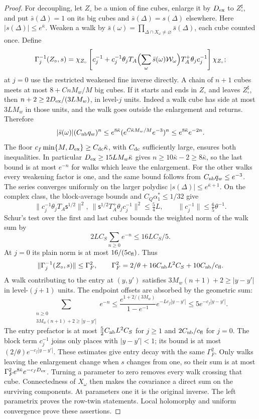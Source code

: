 \documentclass[11pt,letterpaper,reqno]{amsart}
\theoremstyle{definition}
\theoremstyle{remark}
\begin{document}
\begin{proof}
For decoupling, let $Z_\circ$ be a union of fine cubes, enlarge it
by $D_{\rm ex}$ to $Z_\circ^\sharp$, and put $\bar s(\Delta)=1$
on its big cubes and $\bar s(\Delta)=s(\Delta)$ elsewhere.
Here $|s(\Delta)|\le e^{\bar\kappa}$.  Weaken a walk by
$\bar s(\omega)=\prod_{\Delta\cap X_\omega\ne\varnothing}
\bar s(\Delta)$, each cube counted once.  Define
\[
 \Gamma_j^{-1}(Z_\circ,s)=\chi_{Z_\circ}
 \left[c_j^{-1}+c_j^{-1}\theta_jT_A
       \Bigl(\sum_\omega\bar s(\omega)\mathcal W_\omega\Bigr)
                        T_A^+\theta_jc_j^{-1}\right]\chi_{Z_\circ};
\]
at $j=0$ use the restricted weakened fine inverse directly.
A chain of $n+1$ cubes meets at most $8+CnM_w/M$ big cubes.
If it starts and ends in $Z_\circ$ and leaves $Z_\circ^\sharp$,
then $n+2\ge2D_{\rm ex}/(3LM_w)$, in level-$j$ units.
Indeed a walk cube has side at most $3LM_w$ in those units,
and the walk goes outside the enlargement and returns.
Therefore
\[
 |\bar s(\omega)|(C_{\rm nb}q_w)^n
 \le e^{8\bar\kappa}
        (e^{C\bar\kappa M_w/M}e^{-3})^n
 \le e^{8\bar\kappa}e^{-2n}.
\]
The floor $c_f\min\{M,D_{\rm ex}\}\ge
C_{\rm dc}\bar\kappa$, with $C_{\rm dc}$ sufficiently large,
ensures both inequalities. In particular
$D_{\rm ex}\ge15LM_w\bar\kappa$ gives
$n\ge10\bar\kappa-2\ge8\bar\kappa$, so the last bound is
at most $e^{-n}$ for walks which leave the enlargement.
For the other walks every weakening factor is one, and the
same bound follows from $C_{\rm nb}q_w\le e^{-3}$.
The series converges
uniformly on the larger polydisc $|s(\Delta)|\le
e^{\bar\kappa+1}$. On the complex class, the block-average
bounds and $C_Q\alpha_1^*\le1/32$ give
\[
 \|c_j^{-1}\theta_jT_A\mathsf s^{1/2}\|^2,
 \ \|\mathsf s^{1/2}T_A^+\theta_jc_j^{-1}\|^2\le\tfrac54L,
 \qquad \|c_j^{-1}\|\le\tfrac65\theta^{-1}.
\]
Schur's test over the first and last cubes bounds the weighted
norm of the walk sum by
\[
 2LC_S\sum_{n\ge0}e^{-n}\le16LC_S/5.
\]
At $j=0$ its plain norm is at most $16/(5c_{\rm fl})$. Thus
\[
 \|\Gamma_j^{-1}(Z_\circ,s)\|\le\Gamma_F^2,
 \qquad \Gamma_F^2=2/\theta+16C_{\rm nb}L^2C_S
                                      +10C_{\rm nb}/c_{\rm fl}.
\]
A walk contributing to the entry at $(y,y')$ satisfies
$3M_w(n+1)+2\ge|y-y'|$ in level-$(j+1)$ units.
The endpoint offsets are absorbed by the geometric sum:
\[
 \sum_{\substack{n\ge0\\3M_w(n+1)+2\ge|y-y'|}}e^{-n}
 \le\frac{e^{1+2/(3M_w)}}{1-e^{-1}}e^{-Lc_f|y-y'|}
 \le5e^{-c_f|y-y'|}.
\]
The entry prefactor is at most $\tfrac52C_{\rm nb}L^2C_S$
for $j\ge1$ and $2C_{\rm nb}/c_{\rm fl}$ for $j=0$.
The block term $c_j^{-1}$ joins only places with $|y-y'|<1$;
its bound is at most $(2/\theta)e^{-c_f|y-y'|}$.
These estimates give entry decay with the same $\Gamma_F^2$.
Only walks leaving the
enlargement change when $s$ changes from one, so their sum is
at most $\Gamma_F^2e^{8\bar\kappa}e^{-c_fD_{\rm ex}}$.
Turning a parameter to zero removes every walk crossing that
cube.  Connectedness of $X_\omega$ then makes the covariance a
direct sum on the surviving components.  At parameters one it
is the original inverse.  The left parametrix proves the
row-twin statements.  Local holomorphy and uniform convergence
prove these assertions.


\end{proof}
\end{document}
